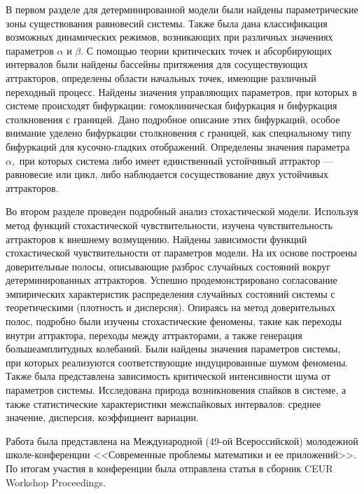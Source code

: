 \documentclass[a4paper, 14pt]{extreport}
\numberwithin{equation}{section}
\numberwithin{figure}{section}
\numberwithin{table}{section}
\begin{document}
В первом разделе для детерминированной модели были найдены параметрические зоны существования равновесий системы. Также была дана классификация возможных динамических режимов, возникающих при различных значениях параметров $ \alpha $ и $ \beta $. С помощью теории критических точек и абсорбирующих интервалов были найдены бассейны притяжения для сосуществующих аттракторов, определены области начальных точек, имеющие различный переходный процесс. Найдены значения управляющих параметров, при которых в системе происходят бифуркации: гомоклиническая бифуркация и бифуркация столкновения с границей. Дано подробное описание этих бифуркаций, особое внимание уделено бифуркации столкновения с границей, как специальному типу бифуркаций для кусочно-гладких отображений. Определены значения параметра $ \alpha $,~при которых система либо имеет единственный устойчивый аттрактор --- равновесие или цикл, либо наблюдается сосуществование двух устойчивых аттракторов.

Во втором разделе проведен подробный анализ стохастической модели. Используя метод функций стохастической чувствительности, изучена чувствительность аттракторов к внешнему возмущению. Найдены зависимости функций стохастической чувствительности от параметров модели. На их основе построены доверительные полосы, описывающие разброс случайных состояний вокруг детерминированных аттракторов. Успешно продемонстрировано согласование эмпирических характеристик распределения случайных состояний системы с теоретическими (плотность и дисперсия). Опираясь на метод доверительных полос, подробно были изучены стохастические феномены, такие как переходы внутри аттрактора, переходы между аттракторами, а также генерация большеамплитудных колебаний. Были найдены значения параметров системы, при которых реализуются соответствующие индуцированные шумом феномены. Также была представлена зависимость критической интенсивности шума от параметров системы. Исследована природа возникновения спайков в системе, а также статистические характеристики межспайковых интервалов: среднее значение, дисперсия, коэффициент вариации.

Работа была представлена на Международной (49-ой Всероссийской) молодежной школе-конференции <<Современные проблемы математики и ее приложений>>. По итогам участия в конференции была отправлена статья в сборник CEUR Workshop Proceedings.
	\newpage
    
	
\end{document}
